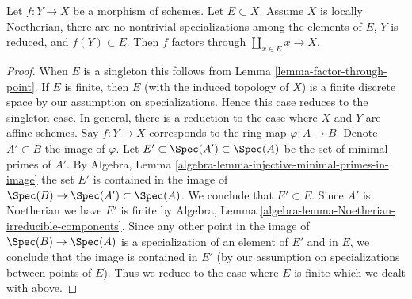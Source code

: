 \begin{lemma}
\label{lemma-factor-through-set-of-points}
Let $f : Y \to X$ be a morphism of schemes. Let $E \subset X$.
Assume $X$ is locally Noetherian, there are no nontrivial specializations
among the elements of $E$, $Y$ is reduced, and $f(Y) \subset E$.
Then $f$ factors through $\coprod_{x \in E} x \to X$.
\end{lemma}

\begin{proof}
When $E$ is a singleton this follows from
Lemma \ref{lemma-factor-through-point}. If $E$ is finite, then $E$
(with the induced topology of $X$) is a finite discrete space by
our assumption on specializations. Hence this case reduces to the
singleton case. In general, there is a reduction to the
case where $X$ and $Y$ are affine schemes. Say $f : Y \to X$ corresponds to
the ring map $\varphi : A \to B$. Denote $A' \subset B$ the image of $\varphi$.
Let $E' \subset \Spec(A') \subset \Spec(A)$ be the set of minimal primes
of $A'$. By Algebra, Lemma \ref{algebra-lemma-injective-minimal-primes-in-image}
the set $E'$ is contained in the image of
$\Spec(B) \to \Spec(A') \subset \Spec(A)$. We conclude that $E' \subset E$.
Since $A'$ is Noetherian we have $E'$ is finite by Algebra, Lemma
\ref{algebra-lemma-Noetherian-irreducible-components}.
Since any other point in the image of $\Spec(B) \to \Spec(A)$ is
a specialization of an element of $E'$ and in $E$, we conclude that
the image is contained in $E'$ (by our assumption on specializations between
points of $E$). Thus we reduce to the case where
$E$ is finite which we dealt with above.
\end{proof}










